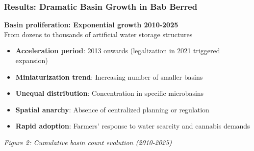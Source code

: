 \documentclass{beamer}
\begin{document}
\begin{frame}
\frametitle{Results: Dramatic Basin Growth in Bab Berred}
\begin{center}
  \textbf{Basin proliferation: Exponential growth 2010-2025}
  \\[0.3cm]
  \small{From dozens to thousands of artificial water storage structures}
\end{center}

\begin{itemize}
  \item \textbf{Acceleration period}: 2013 onwards (legalization in 2021 triggered expansion)
  \item \textbf{Miniaturization trend}: Increasing number of smaller basins
  \item \textbf{Unequal distribution}: Concentration in specific microbasins
  \item \textbf{Spatial anarchy}: Absence of centralized planning or regulation
  \item \textbf{Rapid adoption}: Farmers' response to water scarcity and cannabis demands
\end{itemize}

\begin{center}
  \small{\textit{Figure 2: Cumulative basin count evolution (2010-2025)}}
\end{center}
\end{frame}
\end{document}
